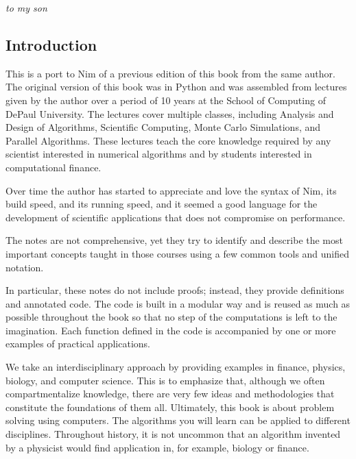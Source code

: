 \documentclass[justified, sixbynine]{tufte-book}
\theoremstyle{plain}%
\newtheorem * {corollary}{Corollary}
\theoremstyle{definition}
\theoremstyle{remark}
\newtheorem * {remark}{Remark}
\newtheorem * {note}{Note}
\begin{document}
\newpage
\thispagestyle{empty}
\phantom{placeholder}
\vspace{2in}
\hskip 2in
{\it to my son}
\newpage
\thispagestyle{empty}
\phantom {a}
\newpage

\setlength{\cftparskip}{\baselineskip}
\tableofcontents

\mainmatter
\begin{fullwidth}

\goodbreak\chapter{Introduction}

This is a port to Nim of a previous edition of this book from the same author. The original version of this book was in Python and was assembled from lectures given by the author over a period of 10 years at the School of Computing of DePaul University. The lectures cover multiple classes, including Analysis and Design of Algorithms, Scientific Computing, Monte Carlo Simulations, and Parallel Algorithms. These lectures teach the core knowledge required by any scientist interested in numerical algorithms and by students interested in computational finance.

Over time the author has started to appreciate and love the syntax of Nim, its build speed, and its running speed, and it seemed a good language for the development of scientific applications that does not compromise on performance.

The notes are not comprehensive, yet they try to identify and describe the most important concepts taught in those courses using a few common tools and unified notation.

In particular, these notes do not include proofs; instead, they provide definitions and annotated code. The code is built in a modular way and is reused as much as possible throughout the book so that no step of the computations is left to the imagination. Each function defined in the code is accompanied by one or more examples of practical applications.

We take an interdisciplinary approach by providing examples in finance, physics, biology, and computer science. This is to emphasize that, although we often compartmentalize knowledge, there are very few ideas and methodologies that constitute the foundations of them all. Ultimately, this book is about problem solving using computers. The algorithms you will learn can be applied to different disciplines. Throughout history, it is not uncommon that an algorithm invented by a physicist would find application in, for example, biology or finance.


\end{fullwidth}
\end{document}
